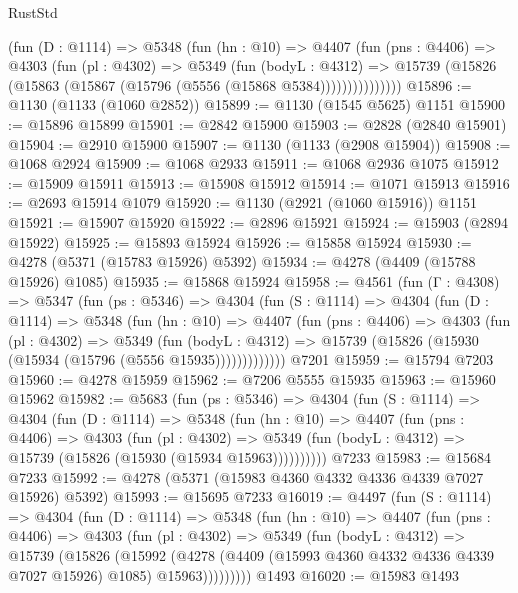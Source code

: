 \begin{lexlean}{RustStd}
\begin{coremodule}
            (fun (D : @1114) =>
            @5348
              (fun (hn : @10) =>
              @4407
                (fun (pns : @4406) =>
                @4303
                  (fun (pl : @4302) =>
                  @5349
                    (fun (bodyL : @4312) =>
                    @15739 (@15826 (@15863 (@15867 (@15796 (@5556 (@15868 @5384)))))))))))))))
@15896 := @1130 (@1133 (@1060 @2852))
@15899 := @1130 (@1545 @5625) @1151
@15900 := @15896 @15899
@15901 := @2842 @15900
@15903 := @2828 (@2840 @15901)
@15904 := @2910 @15900
@15907 := @1130 (@1133 (@2908 @15904))
@15908 := @1068 @2924
@15909 := @1068 @2933
@15911 := @1068 @2936 @1075
@15912 := @15909 @15911
@15913 := @15908 @15912
@15914 := @1071 @15913
@15916 := @2693 @15914 @1079
@15920 := @1130 (@2921 (@1060 @15916)) @1151
@15921 := @15907 @15920
@15922 := @2896 @15921
@15924 := @15903 (@2894 @15922)
@15925 := @15893 @15924
@15926 := @15858 @15924
@15930 := @4278 (@5371 (@15783 @15926) @5392)
@15934 := @4278 (@4409 (@15788 @15926) @1085)
@15935 := @15868 @15924
@15958 := @4561
    (fun (Γ : @4308) =>
    @5347
      (fun (ps : @5346) =>
      @4304
        (fun (S : @1114) =>
        @4304
          (fun (D : @1114) =>
          @5348
            (fun (hn : @10) =>
            @4407
              (fun (pns : @4406) =>
              @4303
                (fun (pl : @4302) =>
                @5349
                  (fun (bodyL : @4312) =>
                  @15739 (@15826 (@15930 (@15934 (@15796 (@5556 @15935)))))))))))))
    @7201
@15959 := @15794 @7203
@15960 := @4278 @15959
@15962 := @7206 @5555 @15935
@15963 := @15960 @15962
@15982 := @5683
    (fun (ps : @5346) =>
    @4304
      (fun (S : @1114) =>
      @4304
        (fun (D : @1114) =>
        @5348
          (fun (hn : @10) =>
          @4407
            (fun (pns : @4406) =>
            @4303
              (fun (pl : @4302) =>
              @5349 (fun (bodyL : @4312) => @15739 (@15826 (@15930 (@15934 @15963))))))))))
    @7233
@15983 := @15684 @7233
@15992 := @4278 (@5371 (@15983 @4360 @4332 @4336 @4339 @7027 @15926) @5392)
@15993 := @15695 @7233
@16019 := @4497
    (fun (S : @1114) =>
    @4304
      (fun (D : @1114) =>
      @5348
        (fun (hn : @10) =>
        @4407
          (fun (pns : @4406) =>
          @4303
            (fun (pl : @4302) =>
            @5349
              (fun (bodyL : @4312) =>
              @15739
                (@15826
                  (@15992
                    (@4278
                      (@4409 (@15993 @4360 @4332 @4336 @4339 @7027 @15926) @1085)
                      @15963)))))))))
    @1493
@16020 := @15983 @1493

\end{coremodule}
\end{lexlean}
